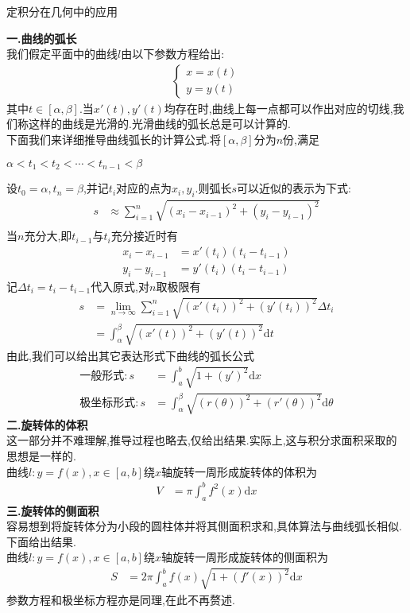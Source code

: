 \documentclass[a4paper,oneside]{ctexart}
\newcommand{\di}{\mathrm{d}}
\begin{document}
\begin{center}定积分在几何中的应用\end{center}
\textbf{一.曲线的弧长}\\
我们假定平面中的曲线$l$由以下参数方程给出:
$$\begin{aligned}
    \displaystyle \left\{\begin{array}{l}x=x(t)\\ y=y(t)\end{array}\right.
\end{aligned}$$
其中$t\in[\alpha,\beta]$.当$x'(t),y'(t)$均存在时,曲线上每一点都可以作出对应的切线,我们称这样的曲线是光滑的.光滑曲线的弧长总是可以计算的.\\
下面我们来详细推导曲线弧长的计算公式.将$[\alpha,\beta]$分为$n$份,满足
\begin{center}$\alpha<t_1<t_2<\cdots<t_{n-1}<\beta$\end{center}
设$t_0=\alpha,t_n=\beta$,并记$t_i$对应的点为$x_i,y_i$.则弧长$s$可以近似的表示为下式:
$$\begin{aligned}
    s &\approx \sum_{i=1}^{n}{\sqrt{(x_i-x_{i-1})^2+(y_i-y_{i-1})^2}} \\
\end{aligned}$$
当$n$充分大,即$t_{i-1}$与$t_i$充分接近时有
$$\begin{aligned}
    x_i-x_{i-1} &= x'(t_i)(t_i-t_{i-1}) \\
    y_i-y_{i-1} &= y'(t_i)(t_i-t_{i-1})
\end{aligned}$$
记$\Delta t_i=t_i-t_{i-1}$代入原式,对$n$取极限有
$$\begin{aligned}
    s &= \lim_{n\to\infty}{\sum_{i=1}^{n}{\sqrt{(x'(t_i))^2+(y'(t_i))^2}\Delta t_i}} \\
      &= \int_{\alpha}^{\beta}{\sqrt{(x'(t))^2+(y'(t))^2}\di t}
\end{aligned}$$
由此,我们可以给出其它表达形式下曲线的弧长公式
$$\begin{aligned}
    \text{一般形式} : s &= \int_{a}^{b}{\sqrt{1+(y')^2}\di x} \\
    \text{极坐标形式} : s &= \int_{\alpha}^{\beta}{\sqrt{(r(\theta))^2+(r'(\theta))^2}\di\theta}
\end{aligned}$$
\textbf{二.旋转体的体积}\\
这一部分并不难理解,推导过程也略去,仅给出结果.实际上,这与积分求面积采取的思想是一样的.\\
曲线$l:y=f(x),x\in[a,b]$绕$x$轴旋转一周形成旋转体的体积为
$$\begin{aligned}
    V &= \pi\int_{a}^{b}{f^2(x)\di x}
\end{aligned}$$
\textbf{三.旋转体的侧面积}\\
容易想到将旋转体分为小段的圆柱体并将其侧面积求和,具体算法与曲线弧长相似.下面给出结果.\\
曲线$l:y=f(x),x\in[a,b]$绕$x$轴旋转一周形成旋转体的侧面积为
$$\begin{aligned}
    S &= 2\pi\int_{a}^{b}{f(x)\sqrt{1+(f'(x))^2}\di x}
\end{aligned}$$
参数方程和极坐标方程亦是同理,在此不再赘述.
\end{document}
